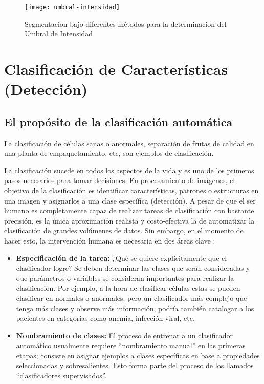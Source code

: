     \begin{figure}[H]
        \centering
        \texttt{[image: umbral-intensidad]}
        \caption{Segmentacion bajo diferentes métodos para la determinacion del Umbral de Intensidad  \protect\cite{Solomon2011-xz}}
        \label{fig:umbral-intensidad}
    \end{figure}
    


\section{Clasificación de Características (Detección)}
\subsection{El propósito de la clasificación automática}
La clasificación de células sanas o anormales, separación de frutas de calidad en una planta de empaquetamiento, etc, son ejemplos de clasificación. 

La clasificación sucede en todos los aspectos de la vida y es uno de los primeros pasos necesarios para tomar decisiones. En procesamiento de imágenes, el objetivo de la clasificación es identificar características, patrones o estructuras en una imagen y asignarlos a una clase específica (detección). A pesar de que el ser humano es completamente capaz de realizar tareas de clasificación con bastante precisión, es la única aproximación realista y costo-efectiva la de automatizar la clasificación de grandes volúmenes de datos. Sin embargo, en el momento de hacer esto, la intervención humana es necesaria en dos áreas clave \cite{Solomon2011-xz}: 

\begin{itemize}
\item \textbf{Especificación de la tarea: }¿Qué se quiere explícitamente que el clasificador logre? Se deben determinar las clases que serán consideradas y que parámetros o variables se consideran importantes para realizar la clasificación. Por ejemplo, a la hora de clasificar células estas se pueden clasificar en normales o anormales, pero un clasificador más complejo que tenga más clases y observe más información, podría también catalogar a los pacientes en categorías como anemia, infección viral, etc.
\item \textbf{Nombramiento de clases: }El proceso de entrenar a un clasificador automático usualmente requiere “nombramiento manual” en las primeras etapas; consiste en asignar ejemplos a clases específicas en base a propiedades seleccionadas y sobresalientes. Esto forma parte del proceso de los llamados “clasificadores supervisados”.
\end{itemize}

